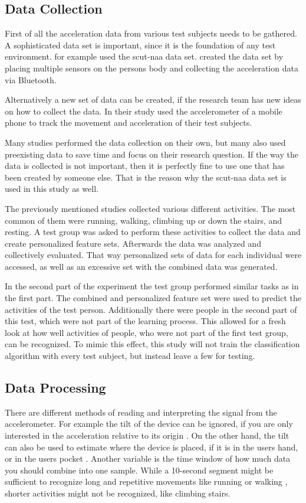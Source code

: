 \subsection{Data Collection}
First of all the acceleration data from various test subjects needs to be gathered. A sophisticated data set is important, since it is the foundation of any test environment. \textcite[]{khan2011feature} for example used the \gls{scut-naa} data set. \textcite[]{xue2010naturalistic} created the data set by placing multiple sensors on the persons body and collecting the acceleration data via Bluetooth.

Alternatively a new set of data can be created, if the research team has new ideas on how to collect the data. In their study \textcite[]{kwapisz2011activity} used the accelerometer of a mobile phone to track the movement and acceleration of their test subjects.

Many studies performed the data collection on their own, but many also used preexisting data to save time and focus on their research question. If the way the data is collected is not important, then it is perfectly fine to use one that has been created by someone else. That is the reason why the \gls{scut-naa} data set is used in this study as well.

The previously mentioned studies collected various different activities. The most common of them were running, walking, climbing up or down the stairs, and resting. A test group was asked to perform these activities to collect the data and create personalized feature sets. Afterwards the data was analyzed and collectively evaluated. That way personalized sets of data for each individual were accessed, as well as an excessive set with the combined data was generated.

In the second part of the experiment the test group performed similar tasks as in the first part. The combined and personalized feature set were used to predict the activities of the test person. Additionally there were people in the second part of this test, which were not part of the learning process. This allowed for a fresh look at how well activities of people, who were not part of the first test group, can be recognized. To mimic this effect, this study will not train the classification algorithm with every test subject, but instead leave a few for testing.


\subsection{Data Processing}
There are different methods of reading and interpreting the signal from the accelerometer. For example the tilt of the device can be ignored, if you are only interested in the acceleration relative to its origin \autocite[]{kwapisz2011activity}. On the other hand, the tilt can also be used to estimate where the device is placed, if it is in the users hand, or in the users pocket \autocite[]{khan2011feature}. Another variable is the time window of how much data you should combine into one sample. While a 10-second segment might be sufficient to recognize long and repetitive movements like running or walking \autocite[]{kwapisz2011activity}, shorter activities might not be recognized, like climbing stairs.

